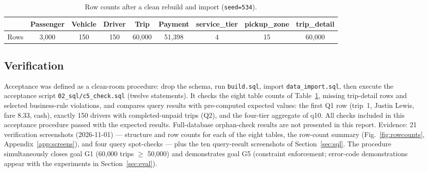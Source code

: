 \begin{table}[ht]
\centering
\caption{Row counts after a clean rebuild and import (\texttt{seed=534}).}
\label{tab:rows}
\small
\begin{tabular}{@{}lcccccccc@{}}
\toprule
 & Passenger & Vehicle & Driver & Trip & Payment & service\_tier & pickup\_zone & trip\_detail \\
\midrule
Rows & 3{,}000 & 150 & 150 & 60{,}000 & 51{,}398 & 4 & 15 & 60{,}000 \\
\bottomrule
\end{tabular}
\end{table}

\subsection{Verification}
\label{sec:verify}
Acceptance was defined as a clean-room procedure: drop the schema, run \texttt{build.sql}, import
\texttt{data\_import.sql}, then execute the acceptance script
\texttt{02\_sql/c5\_check.sql} (twelve statements). It checks the eight table counts of Table~\ref{tab:rows}, missing trip-detail rows and selected
business-rule violations, and compares query results with pre-computed expected values: the first
Q1 row (trip~1, Justin Lewis, fare 8.33, cash), exactly 150 drivers with completed-unpaid trips
(Q2), and the four-tier aggregate of q10. All checks included in this acceptance procedure passed with the expected results. Full-database orphan-check results are not presented in this report. Evidence: 21 verification screenshots (2026-11-01) --- structure and row counts for each of the eight tables, the row-count summary (Fig.~\ref{fig:rowcounts}, Appendix~\ref{app:screens}), and four query spot-checks --- plus the ten query-result screenshots of Section~\ref{sec:sql}. The procedure simultaneously closes
goal G1 (60{,}000 trips $\geq$ 50{,}000) and demonstrates goal G5 (constraint enforcement;
error-code demonstrations appear with the experiments in Section~\ref{sec:eval}).


